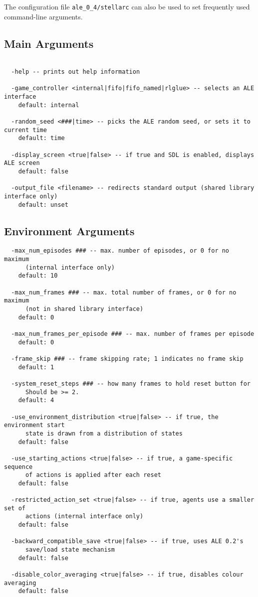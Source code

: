 \documentclass[12pt]{article}
\begin{document}
The configuration file \verb+ale_0_4/stellarc+ can also be used to set frequently used
command-line arguments. 

\subsection{Main Arguments}
\small{
\begin{verbatim}

  -help -- prints out help information

  -game_controller <internal|fifo|fifo_named|rlglue> -- selects an ALE interface
    default: internal

  -random_seed <###|time> -- picks the ALE random seed, or sets it to current time
    default: time

  -display_screen <true|false> -- if true and SDL is enabled, displays ALE screen
    default: false

  -output_file <filename> -- redirects standard output (shared library interface only)
    default: unset
\end{verbatim}
}

\subsection{Environment Arguments}

\small{
\begin{verbatim}
  -max_num_episodes ### -- max. number of episodes, or 0 for no maximum 
      (internal interface only)
    default: 10

  -max_num_frames ### -- max. total number of frames, or 0 for no maximum 
      (not in shared library interface)
    default: 0

  -max_num_frames_per_episode ### -- max. number of frames per episode
    default: 0

  -frame_skip ### -- frame skipping rate; 1 indicates no frame skip 
    default: 1

  -system_reset_steps ### -- how many frames to hold reset button for 
      Should be >= 2.
    default: 4

  -use_environment_distribution <true|false> -- if true, the environment start 
      state is drawn from a distribution of states
    default: false

  -use_starting_actions <true|false> -- if true, a game-specific sequence
      of actions is applied after each reset
    default: false

  -restricted_action_set <true|false> -- if true, agents use a smaller set of 
      actions (internal interface only)
    default: false

  -backward_compatible_save <true|false> -- if true, uses ALE 0.2's 
      save/load state mechanism
    default: false

  -disable_color_averaging <true|false> -- if true, disables colour averaging 
    default: false

\end{verbatim}
}
\end{document}
